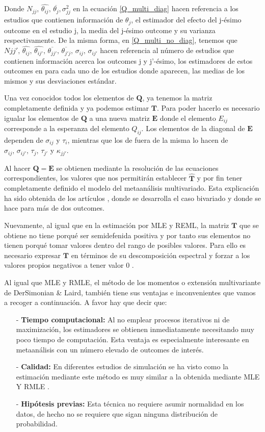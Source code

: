 \documentclass[a4paper,openright,12pt]{report}
\begin{document}
{Donde $N_{jj},\, \widehat{\theta_{ij}},\, \overline{\theta_{j}}, \sigma_{jj}^{2}$ en la ecuación \ref{Q_multi_diag}} hacen referencia a los estudios que contienen información de $\theta_{j}$, el estimador del efecto del j-ésimo outcome en el estudio j, la media del j-ésimo outcome  y su varianza respectivamente. De la misma forma, en \ref{Q_multi_no_diag}, tenemos que $N{jj'},\, \widehat{\theta_{ij}},\, \widehat{\theta_{ij'}},\, \overline{\theta_{jj'}},\, \overline{\theta_{j'j}},\, \sigma_{ij},\, \sigma_{ij'}$ hacen referencia al número de estudios que contienen información acerca los outcomes j y j'-ésimo, los estimadores de estos outcomes en para cada uno de los estudios donde aparecen, las medias de los mismos y sus desviaciones estándar.

Una vez conocidos todos los elementos de $\mathbf{Q}$, ya tenemos la matriz completamente definida y ya podemos estimar $\mathbf{T}$. Para poder hacerlo es necesario igualar los elementos de $\mathbf{Q}$ a una nueva matriz $\mathbf{E}$ donde el elemento $E_{ij}$ corresponde a la esperanza del elemento $Q_{ij}$. Los elementos de la diagonal de $\mathbf{E}$ dependen de $\sigma_{ij}$ y $\tau_{i}$, mientras que los de fuera de la misma lo hacen de $\sigma_{ij},\, \sigma_{ij'},\, \tau_{j},\, \tau_{j'}$ y $\kappa_{jj'}$.

Al hacer $\mathbf{Q}=\mathbf{E}$ se obtienen mediante la resolución de las ecuaciones correspondientes, los valores que nos permitirán establecer $\mathbf{\widehat{T}}$ y por fin tener completamente definido el modelo del metaanálisis multivariado. Esta explicación ha sido obtenida de los artículos \cite{Jackson2010}, donde se desarrolla el caso bivariado y \cite{Mavridis2011} donde se hace para más de dos outcomes.

Nuevamente, al igual que en la estimación por MLE y REML, la matriz $\mathbf{T}$ que se obtiene no tiene porqué ser semidefenida positiva y por tanto sus elementos no tienen porqué tomar valores dentro del rango de posibles valores. Para ello es necesario expresar $\mathbf{T}$ en términos de su descomposición espectral y forzar a los valores propios negativos a tener valor 0 \cite{Jackson2010}.

Al igual que MLE y RMLE, el método de los momentos o extensión multivariante de DerSimonian \& Laird, también tiene sus ventajas e inconvenientes que vamos a recoger a continuación. A favor hay que decir que:
\begin{itemize}
\item[-] \textbf{Tiempo computacional:} Al no emplear procesos iterativos ni de maximización, los estimadores se obtienen inmediatamente necesitando muy poco tiempo de computación. Esta ventaja es especialmente interesante en metaanálisis con un número elevado de outcomes de interés.
\item[-] \textbf{Calidad:} En diferentes estudios de simulación se ha visto como la estimación mediante este método es muy similar a la obtenida mediante MLE Y RMLE \cite{Jackson2011}.
\item[-] \textbf{Hipótesis previas:} Esta técnica no requiere asumir normalidad en los datos, de hecho no se requiere que sigan ninguna distribución de probabilidad.
\end{itemize}
\end{document}

